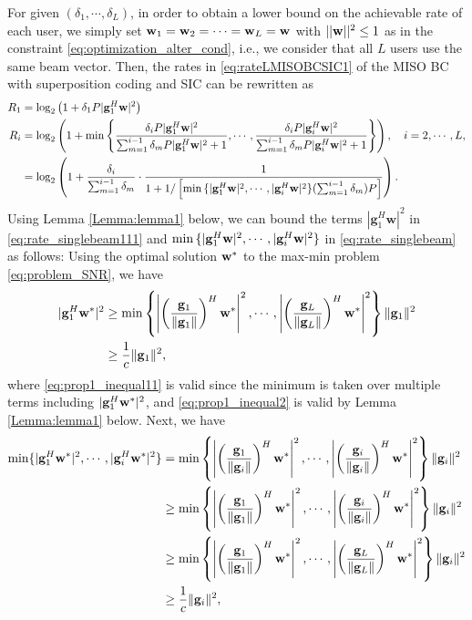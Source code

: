 \documentclass[11pt, draft, onecolumn ]{IEEEtran}
\begin{document}
    For given $(\delta_1, \cdots, \delta_L)$, in order to  obtain a lower bound on the achievable rate of each user, we simply set
    ${\bf w}_1 = {\bf w}_2 = \cdots = {\bf w}_L = {\bf w}$ with $||{\bf w}||^2 \le 1$ as in the constraint \eqref{eq:optimization_alter_cond}, i.e., we consider that all $L$ users use the same beam vector. Then,
     the rates in
     \eqref{eq:rateLMISOBCSIC1}  of the  MISO BC with superposition coding and SIC
     can be rewritten as
\begin{align}
    R_1 &=  \log_2 \left( 1 + \delta_1 P|\mathbf{g}_1^H \mathbf{w}|^2\right) \label{eq:rate_singlebeam111} \\
    R_i &=  \log_2 \left( 1 +  \min \left\{ \frac{ \delta_i P |{\bf g}_1^H {\bf w}|^2}{\sum_{m=1}^{i-1} \delta_m P|{\bf g}_1^H {\bf w}|^2 + 1}
    , \cdots ,\frac{ \delta_i P |{\bf g}_i^H {\bf w}|^2}{\sum_{m=1}^{i-1} \delta_m P|{\bf g}_i^H {\bf w}|^2 + 1}\right\}\right), \quad i = 2, \cdots, L, \nonumber \\
    &=  \log_2 \left(1 + \frac{\delta_i}{\sum_{m=1}^{i-1} \delta_m} \cdot \frac{1}{1+ 1/\left[\min{\{ |{\bf g}_1^H{\bf w}|^2,\cdots, |{\bf g}_i^H {\bf w}|^2 \}} (\sum_{m=1}^{i-1} \delta_m) P\right]} \right). \label{eq:rate_singlebeam}
\end{align}
Using Lemma \ref{Lemma:lemma1} below, we can bound the terms $|\mathbf{g}_1^H \mathbf{w}|^2$ in \eqref{eq:rate_singlebeam111} and $\min{\{ |{\bf g}_1^H{\bf w}|^2,\cdots, |{\bf g}_i^H {\bf w}|^2 \}}$ in  \eqref{eq:rate_singlebeam} as follows:
Using the optimal solution ${\bf w}^*$ to the max-min problem \eqref{eq:problem_SNR}, we have
\begin{align}
    |{\bf g}_1^H {\bf w}^*|^2 &\geq \min\left\{\left|\left(\frac{{\bf g}_1}{\|{\bf g}_1\|}\right)^H {\bf w}^*\right|^2, \cdots,  \left|\left(\frac{{\bf g}_L}{\|{\bf g}_L\|}\right)^H {\bf w}^*\right|^2\right\}  \|{\bf g}_1\|^2   \label{eq:prop1_inequal11} \\
    &\geq\frac{1}{c} \|{\bf g}_1\|^2,  \label{eq:prop1_inequal2}
\end{align}
where  \eqref{eq:prop1_inequal11} is valid since the minimum is taken over multiple terms including $|{\bf g}_1^H {\bf w}^*|^2$, and \eqref{eq:prop1_inequal2} is valid by Lemma \ref{Lemma:lemma1} below. Next, we have
\begin{align}
    \min\{|{\bf g}_1^H {\bf w}^*|^2, \cdots, |{\bf g}_i^H {\bf w}^*|^2\} &= \min\left\{\left|\left(\frac{{\bf g}_1}{\|{\bf g}_i\|}\right)^H {\bf w}^*\right|^2,\cdots, \left|\left(\frac{{\bf g}_i}{\|{\bf g}_i\|}\right)^H {\bf w}^*\right|^2\right\}  \|{\bf g}_i\|^2 \\
    &\geq  \min\left\{\left|\left(\frac{{\bf g}_1}{\|{\bf g}_1\|}\right)^H {\bf w}^*\right|^2, \cdots, \left|\left(\frac{{\bf g}_i}{\|{\bf g}_i\|}\right)^H {\bf w}^*\right|^2\right\}  \|{\bf g}_i\|^2 \label{eq_prop1_inequal21} \\
    &\geq  \min\left\{\left|\left(\frac{{\bf g}_1}{\|{\bf g}_1\|}\right)^H {\bf w}^*\right|^2, \cdots, \left|\left(\frac{{\bf g}_L}{\|{\bf g}_L\|}\right)^H {\bf w}^*\right|^2\right\}  \|{\bf g}_i\|^2 \label{eq_prop1_inequal22}\\
    &\geq\frac{1}{c} \|{\bf g}_i\|^2, \label{eq_prop1_inequal23}
\end{align}
\end{document}
